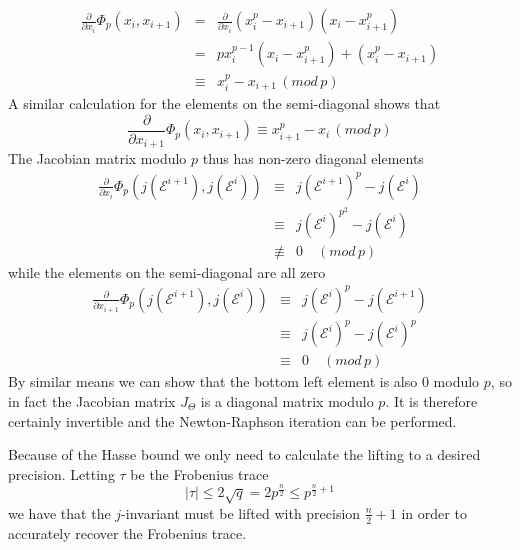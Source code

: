 \begin{eqnarray}
 \frac{\partial}{\partial x_i} \Phi_p(x_i, x_{i+1}) &=& \frac{\partial}{\partial x_i}(x_i^p-x_{i+1})(x_i-x_{i+1}^p)\nonumber \\
						    &=& p x_i^{p-1}(x_i-x_{i+1}^p)+(x_i^p-x_{i+1})\nonumber \\
						    &\equiv& x_i^p-x_{i+1}\, (mod\, p) \nonumber
\end{eqnarray}
A similar calculation for the elements on the semi-diagonal shows that
$$ \frac{\partial}{\partial x_{i+1}} \Phi_p(x_i, x_{i+1}) \equiv x_{i+1}^p - x_i \, (mod\,p) $$
The Jacobian matrix modulo $p$ thus has non-zero diagonal elements
\begin{eqnarray}
 \frac{\partial}{\partial x_i} \Phi_p(j(\mathscr{E}^{i+1}), j(\mathscr{E}^i)) &\equiv& j(\mathscr{E}^{i+1})^p-j(\mathscr{E}^i) \nonumber \\
									      &\equiv& j(\mathscr{E}^i)^{p^2}-j(\mathscr{E}^i) \nonumber \\
									      &\not\equiv& 0 \quad (mod\, p) \nonumber
\end{eqnarray}
while the elements on the semi-diagonal are all zero
\begin{eqnarray}
 \frac{\partial}{\partial x_{i+1}} \Phi_p(j(\mathscr{E}^{i+1}), j(\mathscr{E}^i)) &\equiv& j(\mathscr{E}^i)^p-j(\mathscr{E}^{i+1}) \nonumber \\
										  &\equiv& j(\mathscr{E}^i)^p-j(\mathscr{E}^i)^p \nonumber \\
										  &\equiv& 0 \quad (mod\, p) \nonumber
\end{eqnarray}
By similar means we can show that the bottom left element is also $0$ modulo $p$, so in fact the Jacobian matrix
$J_\Theta$ is a diagonal matrix modulo $p$.
It is therefore certainly invertible and the Newton-Raphson iteration can be performed.

Because of the Hasse bound we only need to calculate the lifting to a desired precision. Letting $\tau$
be the Frobenius trace
$$\mid \tau \mid \leq 2\sqrt{q} = 2p^{\frac{n}{2}} \leq p^{\frac{n}{2}+1} $$
we have that the $j$-invariant must be lifted with precision $\frac{n}{2}+1$ in order to accurately recover
the Frobenius trace.

